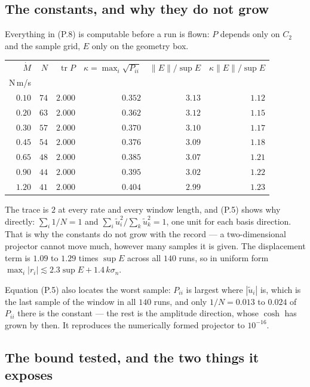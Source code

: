 \documentclass[10pt]{article}
\newcommand{\Mdot}{\dot M}
\begin{document}
\subsection{The constants, and why they do not grow}

Everything in (P.8) is computable before a run is flown: $P$ depends
only on $C_2$ and the sample grid, $E$ only on the geometry box.

\begin{center}\small
\begin{tabular}{@{}rrrrrr@{}}
\toprule
$\Mdot$ & $N$ & $\operatorname{tr}P$ & $\kappa=\max_i\sqrt{P_{ii}}$ &
$\|E\|/\sup E$ & $\kappa\|E\|/\sup E$\\
N\,m/s & & & & & \\
\midrule
$0.10$ & $74$ & $2.000$ & $0.352$ & $3.13$ & $1.12$\\
$0.20$ & $63$ & $2.000$ & $0.362$ & $3.12$ & $1.15$\\
$0.30$ & $57$ & $2.000$ & $0.370$ & $3.10$ & $1.17$\\
$0.45$ & $54$ & $2.000$ & $0.376$ & $3.09$ & $1.18$\\
$0.65$ & $48$ & $2.000$ & $0.385$ & $3.07$ & $1.21$\\
$0.90$ & $44$ & $2.000$ & $0.395$ & $3.02$ & $1.22$\\
$1.20$ & $41$ & $2.000$ & $0.404$ & $2.99$ & $1.23$\\
\bottomrule
\end{tabular}
\end{center}

The trace is $2$ at every rate and every window length, and (P.5) shows
why directly: $\sum_i 1/N = 1$ and
$\sum_i\tilde u_i^2/\sum_k\tilde u_k^2 = 1$, one unit for each basis
direction. That is why the constants do not grow with the record --- a
two-dimensional projector cannot move much, however many samples it is
given. The displacement term is $1.09$ to $1.29$ times $\sup E$ across
all $140$ runs, so in uniform form
$\max_i|r_i| \lesssim 2.3\sup E + 1.4\,k\sigma_n$.

Equation (P.5) also locates the worst sample: $P_{ii}$ is largest where
$|\tilde u_i|$ is, which is the last sample of the window in all $140$
runs, and only $1/N = 0.013$ to $0.024$ of $P_{ii}$ there is the
constant --- the rest is the amplitude direction, whose $\cosh$ has
grown by then. It reproduces the numerically formed projector to
$10^{-16}$.

\subsection{The bound tested, and the two things it exposes}
\end{document}
